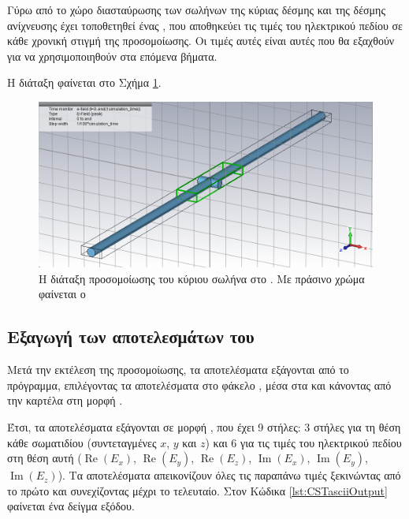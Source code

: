Γύρω από το χώρο διασταύρωσης των σωλήνων της κύριας δέσμης και της δέσμης ανίχνευσης έχει τοποθετηθεί ένας , που αποθηκεύει τις τιμές του ηλεκτρικού πεδίου σε κάθε χρονική στιγμή της προσομοίωσης. 
Οι τιμές αυτές είναι αυτές που θα εξαχθούν για να χρησιμοποιηθούν στα επόμενα βήματα.

Η διάταξη φαίνεται στο Σχήμα \ref{fig:CST-export-main-beam-project-efield-box}.

\begin{figure}[tbh]
\includegraphics[width=\textwidth]{figures/export-main-beam-project-efield-box}
\centering
\caption[Η διάταξη προσομοίωσης του κύριου σωλήνα στο ]{Η διάταξη προσομοίωσης του κύριου σωλήνα στο . Με πράσινο χρώμα φαίνεται ο }
\label{fig:CST-export-main-beam-project-efield-box}
\end{figure}

\subsection{Εξαγωγή των αποτελεσμάτων του }
Μετά την εκτέλεση της προσομοίωσης, τα αποτελέσματα εξάγονται από το πρόγραμμα, επιλέγοντας τα αποτελέσματα στο φάκελο , μέσα στα  και κάνοντας  από την καρτέλα  στη μορφή .

Έτσι, τα αποτελέσματα εξάγονται σε μορφή , που έχει 9 στήλες: 3 στήλες για τη θέση κάθε σωματιδίου (συντεταγμένες $x$, $y$ και $z$) και 6 για τις τιμές του ηλεκτρικού πεδίου στη θέση αυτή ($\operatorname{Re}(E_x)$, $\operatorname{Re}(E_y)$, $\operatorname{Re}(E_z)$, $\operatorname{Im}(E_x)$, $\operatorname{Im}(E_y)$, $\operatorname{Im}(E_z)$).
Τα αποτελέσματα απεικονίζουν όλες τις παραπάνω τιμές ξεκινώντας από το πρώτο  και συνεχίζοντας μέχρι το τελευταίο.
Στον Κώδικα \ref{lst:CSTasciiOutput} φαίνεται ένα δείγμα εξόδου.

